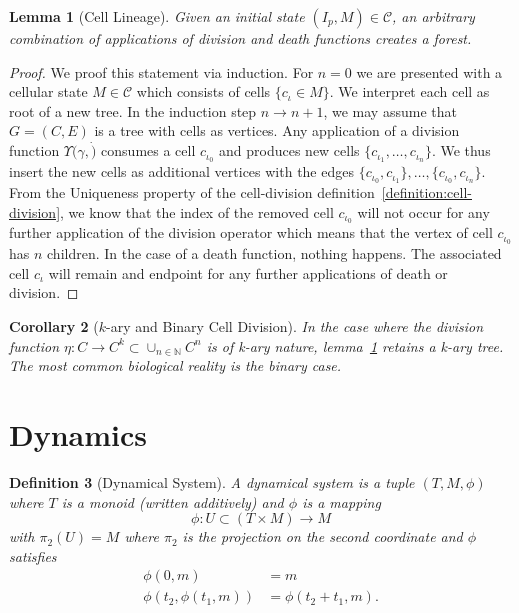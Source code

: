 \documentclass{article}
\newtheorem{definition}{Definition}[section]
\newtheorem{lemma}[definition]{Lemma}
\newtheorem{corollary}[definition]{Corollary}
\begin{document}
\begin{lemma}[Cell Lineage]
    \label{lemma:cell-lineage}
    Given an initial state $(I_p,M)\in\mathscr{C}$, an arbitrary combination of applications of
    division and death functions creates a forest.
\end{lemma}
\begin{proof}
    We proof this statement via induction. For $n=0$ we are presented with a cellular state
    $M\in\mathscr{C}$ which consists of cells $\{c_\iota\in M\}$.
    We interpret each cell as root of a new tree.
    In the induction step $n\rightarrow n+1$, we may assume that $G=(C,E)$ is a tree with
    cells as vertices.
    Any application of a division function $\Upsilon(\gamma, \dot)$ consumes a cell $c_{\iota_0}$
    and produces new cells $\{c_{\iota_1},\dots,c_{\iota_n}\}$.
    We thus insert the new cells as additional vertices with the edges
    $\{c_{\iota_0},c_{\iota_1}\},\dots,\{c_{\iota_0},c_{\iota_n}\}$.
    From the Uniqueness property of the cell-division definition~\ref{definition:cell-division},
    we know that the index of the removed cell $c_{\iota_0}$ will not occur for any further
    application of the division operator which means that the vertex of cell $c_{\iota_0}$ has $n$
    children.
    In the case of a death function, nothing happens.
    The associated cell $c_\iota$ will remain and endpoint for any further applications of death
    or division.
\end{proof}
\begin{corollary}[$k$-ary and Binary Cell Division]
    In the case where the division function $\eta:C\rightarrow C^k\subset\cup_{n\in\mathbb{N}}C^n$
    is of k-ary nature, lemma~\ref{lemma:cell-lineage} retains a k-ary tree.
    The most common biological reality is the binary case.
\end{corollary}

\section{Dynamics}
\label{section:dynamics}
\begin{definition}[Dynamical System]
    A dynamical system is a tuple $(T,M,\phi)$ where $T$ is a monoid (written additively) and
    $\phi$ is a mapping
    \begin{equation}
        \phi : U\subset(T\times M) \rightarrow M
    \end{equation}
    with $\pi_2(U) = M$ where $\pi_2$ is the projection on the second coordinate and $\phi$
    satisfies
    \begin{align}
        \phi(0,m) &= m\\
        \phi(t_2, \phi(t_1, m)) &= \phi(t_2+t_1,m).
    \end{align}
\end{definition}
\end{document}
